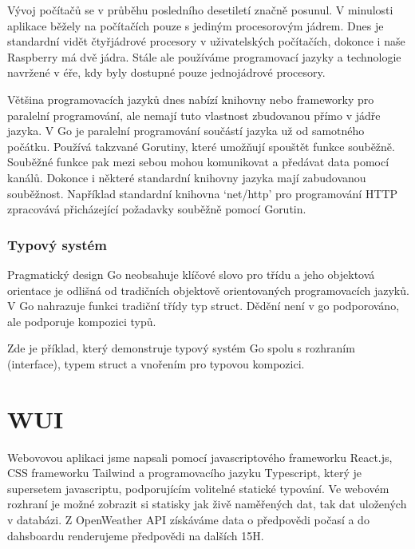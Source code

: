\documentclass[12pt,a4paper]{article}
\begin{document}
Vývoj počítačů se v průběhu posledního desetiletí značně posunul. V minulosti aplikace běžely na počítačích pouze s jediným procesorovým jádrem. Dnes je standardní vidět čtyřjádrové procesory v uživatelských počítačích, dokonce i naše Raspberry má dvě jádra. Stále ale používáme programovací jazyky a technologie navržené v éře, kdy byly dostupné pouze jednojádrové procesory.

Většina programovacích jazyků dnes nabízí knihovny nebo frameworky pro \linebreak paralelní programování, ale nemají tuto vlastnost zbudovanou přímo v jádře jazyka. V Go je paralelní programování součástí jazyka už od samotného počátku. Používá takzvané Gorutiny, které umožňují spouštět funkce souběžně. Souběžné funkce pak mezi sebou mohou komunikovat a předávat data pomocí kanálů. Dokonce i některé standardní knihovny jazyka mají zabudovanou souběžnost. Například standardní knihovna `net/http' pro programování HTTP zpracovává přicházející požadavky souběžně pomocí Gorutin.

\subsubsection{Typový systém}

Pragmatický design Go neobsahuje klíčové slovo pro třídu a jeho objektová orientace je odlišná od tradičních objektově orientovaných programovacích jazyků. V Go nahrazuje funkci tradiční třídy typ struct. Dědění není v go podporováno, ale podporuje kompozici typů.

Zde je příklad, který demonstruje typový systém Go spolu s rozhraním (interface), typem struct a vnořením pro typovou kompozici.


\clearpage


\section{WUI}

Webovovou aplikaci jsme napsali pomocí javascriptového frameworku
React.js, CSS frameworku Tailwind a programovacího jazyku Typescript, který je supersetem javascriptu, podporujícím volitelné statické typování. Ve webovém rozhraní je možné zobrazit
si statisky jak živě naměřených dat, tak dat uložených v databázi. Z OpenWeather \ac{API} získáváme data o předpovědi počasí a do dahsboardu renderujeme předpovědi na dalších 15H.
\end{document}

